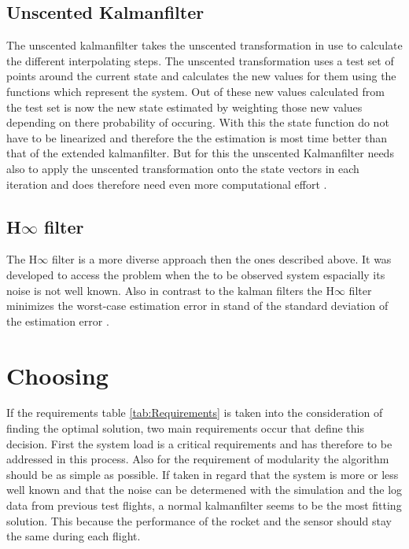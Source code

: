   \subsection{Unscented Kalmanfilter}
  The unscented kalmanfilter takes the unscented transformation in use to calculate the different interpolating steps.
  The unscented transformation uses a test set of points around the current state and calculates the new values for them using the functions which represent the system.
  Out of these new values calculated from the test set is now the new state estimated by weighting those new values depending on there probability of occuring. 
  With this the state function do not have to be linearized and therefore the the estimation is most time better than that of the extended kalmanfilter.
  But for this the unscented Kalmanfilter needs also to apply the unscented transformation onto the state vectors in each iteration
  and does therefore need even more computational effort \cite{SimonDan2006Ose:}.
  
  \subsection{H$\infty$ filter}
  The H$\infty$ filter is a more diverse approach then the ones described above.
  It was developed to access the problem when the to be observed system espacially its noise is not well known.
  Also in contrast to the kalman filters the H$\infty$ filter minimizes the worst-case estimation error 
  in stand of the standard deviation of the estimation error \cite{SimonDan2006Ose:}.
  
  \section{Choosing}
  If the requirements table \ref{tab:Requirements} is taken into the consideration of finding
  the optimal solution, two main requirements occur that define this decision.
  First the system load is a critical requirements and has therefore to be addressed in this process.
  Also for the requirement of modularity the algorithm should be as simple as possible.
  If taken in regard that the system is more or less well known and that the noise can be
  determened with the simulation and the log data from previous test flights,
  a normal kalmanfilter seems to be the most fitting solution.
  This because the performance of the rocket and the sensor should stay the same during
  each flight. 
  
